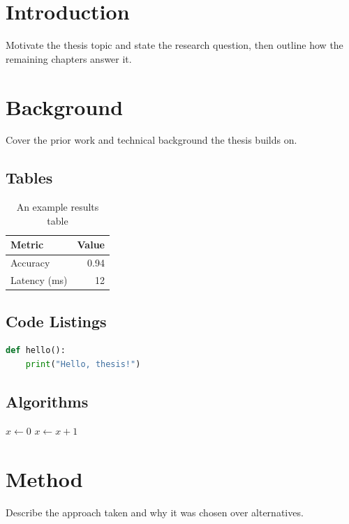 \documentclass[a4paper,11pt]{report}
\begin{document}
\chapter{Introduction}
\label{ch:intro}
Motivate the thesis topic and state the research question, then
outline how the remaining chapters answer it.

\chapter{Background}
\label{ch:background}
Cover the prior work and technical background the thesis builds on.

\section{Tables}
\begin{table}[ht]
\centering
\begin{tabular}{@{}lr@{}}
\toprule
Metric & Value \\
\midrule
Accuracy & 0.94 \\
Latency (ms) & 12 \\
\bottomrule
\end{tabular}
\caption{An example results table}
\label{tab:example}
\end{table}

\section{Code Listings}
\begin{lstlisting}[language=Python, caption={An example listing}]
def hello():
    print("Hello, thesis!")
\end{lstlisting}

\section{Algorithms}
\begin{algorithm}
\caption{An example algorithm}
\begin{algorithmic}
\State $x \gets 0$
    \State $x \gets x + 1$
\EndWhile
\end{algorithmic}
\end{algorithm}

\chapter{Method}
\label{ch:method}
Describe the approach taken and why it was chosen over alternatives.
\end{document}

